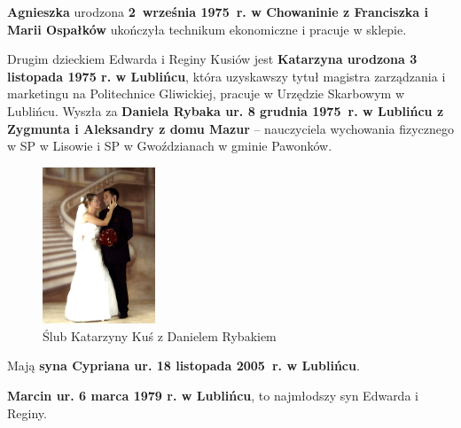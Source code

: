 \textbf{Agnieszka} urodzona \textbf{2~września 1975~r. w Chowaninie z Franciszka i Marii Ospałków} ukończyła technikum ekonomiczne i pracuje w sklepie.

Drugim dzieckiem Edwarda i Reginy Kusiów jest \textbf{Katarzyna urodzona 3 listopada 1975 r. w Lublińcu}, która uzyskawszy tytuł magistra zarządzania i marketingu na Politechnice Gliwickiej, pracuje w Urzędzie Skarbowym w Lublińcu. Wyszła za \textbf{Daniela Rybaka ur. 8 grudnia 1975~r. w Lublińcu z Zygmunta i Aleksandry z domu Mazur} -- nauczyciela wychowania fizycznego w SP w Lisowie i SP w Gwoździanach w gminie Pawonków.

\begin{figure} [!h]
\begin{center}
\includegraphics[width=0.3\textwidth]{photo/katarzyna_daniel_rybak_slub.jpg}
\caption{Ślub Katarzyny Kuś z Danielem Rybakiem}
\label{rys:katarzyna_daniel_rybak_slub}
\end{center}
\end{figure}

Mają \textbf{syna Cypriana ur. 18 listopada 2005~r. w Lublińcu}.

\textbf{Marcin ur. 6 marca 1979 r. w Lublińcu}, to najmłodszy syn Edwarda i Reginy.

